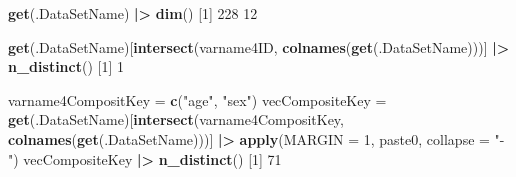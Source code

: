 \documentclass[
]{article}
\newenvironment{Shaded}{\begin{snugshade}}{\end{snugshade}}
\newcommand{\AttributeTok}[1]{\textcolor[rgb]{0.13,0.29,0.53}{#1}}
\newcommand{\DecValTok}[1]{\textcolor[rgb]{0.00,0.00,0.81}{#1}}
\newcommand{\FunctionTok}[1]{\textcolor[rgb]{0.13,0.29,0.53}{\textbf{#1}}}
\newcommand{\NormalTok}[1]{#1}
\newcommand{\OtherTok}[1]{\textcolor[rgb]{0.56,0.35,0.01}{#1}}
\newcommand{\SpecialCharTok}[1]{\textcolor[rgb]{0.81,0.36,0.00}{\textbf{#1}}}
\newcommand{\StringTok}[1]{\textcolor[rgb]{0.31,0.60,0.02}{#1}}
\begin{document}
\begin{Shaded}
\begin{Highlighting}[]
\FunctionTok{get}\NormalTok{(.DataSetName) }\SpecialCharTok{|\textgreater{}} \FunctionTok{dim}\NormalTok{()}
\NormalTok{[}\DecValTok{1}\NormalTok{] }\DecValTok{228}  \DecValTok{12}
\end{Highlighting}
\end{Shaded}

\begin{Shaded}
\begin{Highlighting}[]
\FunctionTok{get}\NormalTok{(.DataSetName)[}\FunctionTok{intersect}\NormalTok{(varname4ID, }\FunctionTok{colnames}\NormalTok{(}\FunctionTok{get}\NormalTok{(.DataSetName)))] }\SpecialCharTok{|\textgreater{}} \FunctionTok{n\_distinct}\NormalTok{()}
\NormalTok{[}\DecValTok{1}\NormalTok{] }\DecValTok{1}
\end{Highlighting}
\end{Shaded}

\begin{Shaded}
\end{Shaded}

\begin{Shaded}
\begin{Highlighting}[]
  
\NormalTok{varname4CompositKey }\OtherTok{=} \FunctionTok{c}\NormalTok{(}\StringTok{"age"}\NormalTok{, }\StringTok{"sex"}\NormalTok{)}
\NormalTok{vecCompositeKey }\OtherTok{=} \FunctionTok{get}\NormalTok{(.DataSetName)[}\FunctionTok{intersect}\NormalTok{(varname4CompositKey, }\FunctionTok{colnames}\NormalTok{(}\FunctionTok{get}\NormalTok{(.DataSetName)))] }\SpecialCharTok{|\textgreater{}} \FunctionTok{apply}\NormalTok{(}\AttributeTok{MARGIN =} \DecValTok{1}\NormalTok{, paste0, }\AttributeTok{collapse =} \StringTok{"{-}"}\NormalTok{)}
\NormalTok{vecCompositeKey }\SpecialCharTok{|\textgreater{}} \FunctionTok{n\_distinct}\NormalTok{()}
\NormalTok{[}\DecValTok{1}\NormalTok{] }\DecValTok{71}
\end{Highlighting}
\end{Shaded}
\end{document}
